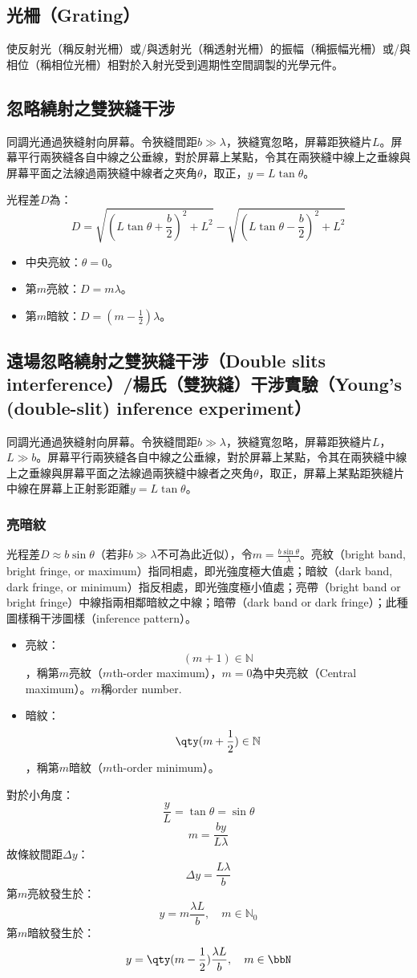 \documentclass[a4paper,12pt]{report}
\begin{document}
\subsection{光柵（Grating）}
使反射光（稱反射光柵）或/與透射光（稱透射光柵）的振幅（稱振幅光柵）或/與相位（稱相位光柵）相對於入射光受到週期性空間調製的光學元件。
\subsection{忽略繞射之雙狹縫干涉}
同調光通過狹縫射向屏幕。令狹縫間距$b\gg\lambda$，狹縫寬忽略，屏幕距狹縫片$L$。屏幕平行兩狹縫各自中線之公垂線，對於屏幕上某點，令其在兩狹縫中線上之垂線與屏幕平面之法線過兩狹縫中線者之夾角$\theta$，取正，$y=L\tan\theta$。

光程差$D$為：
\[D=\sqrt{\left(L\tan\theta+\frac{b}{2}\right)^2+L^2}-\sqrt{\left(L\tan\theta-\frac{b}{2}\right)^2+L^2}\]
\begin{itemize}
\item 中央亮紋：$\theta=0$。
\item 第$m$亮紋：$D=m\lambda$。
\item 第$m$暗紋：$D=\left(m-\frac{1}{2}\right)\lambda$。
\end{itemize}
\subsection{遠場忽略繞射之雙狹縫干涉（Double slits interference）/楊氏（雙狹縫）干涉實驗（Young's (double-slit) inference experiment）}
同調光通過狹縫射向屏幕。令狹縫間距$b\gg\lambda$，狹縫寬忽略，屏幕距狹縫片$L$，$L\gg b$。屏幕平行兩狹縫各自中線之公垂線，對於屏幕上某點，令其在兩狹縫中線上之垂線與屏幕平面之法線過兩狹縫中線者之夾角$\theta$，取正，屏幕上某點距狹縫片中線在屏幕上正射影距離$y=L\tan\theta$。
\subsubsection{亮暗紋}
光程差$D\approx b\sin\theta$（若非$b\gg \lambda$不可為此近似），令$m=\frac{b\sin\theta}{\lambda}$。亮紋（bright band, bright fringe, or maximum）指同相處，即光強度極大值處；暗紋（dark band, dark fringe, or minimum）指反相處，即光強度極小值處；亮帶（bright band or bright fringe）中線指兩相鄰暗紋之中線；暗帶（dark band or dark fringe）；此種圖樣稱干涉圖樣（inference pattern）。
\begin{itemize}
\item 亮紋：
\[(m+1)\in\mathbb{N}\]
，稱第$m$亮紋（$m$th-order maximum），$m=0$為中央亮紋（Central maximum）。$m$稱order number.
\item 暗紋：
\[\qty(m+\frac{1}{2})\in\mathbb{N}\]
，稱第$m$暗紋（$m$th-order minimum）。
\end{itemize}
對於小角度：
\[\frac{y}{L}=\tan\theta=\sin\theta\]
\[m=\frac{by}{L\lambda}\]
故條紋間距$\Delta y$：
\[\Delta y=\frac{L\lambda}{b}\]
第$m$亮紋發生於：
\[y=m\frac{\lambda L}{b},\quad m\in\mathbb{N}_0\]
第$m$暗紋發生於：
\[y=\qty(m-\frac{1}{2})\frac{\lambda L}{b},\quad m\in\bbN\]
\end{document}
